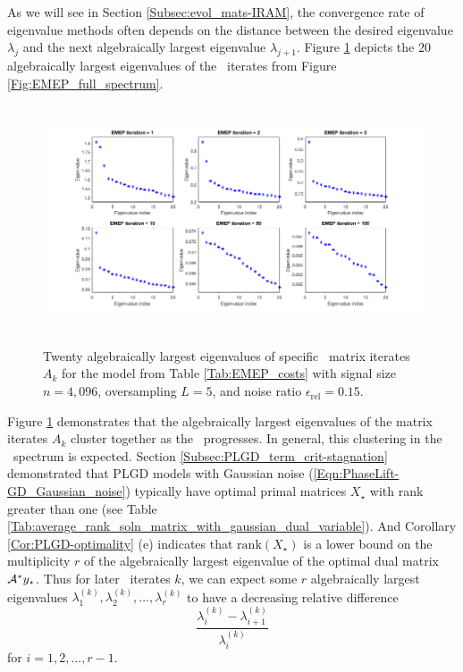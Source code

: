 As we will see in Section \ref{Subsec:evol_mats-IRAM}, the convergence rate of eigenvalue methods often depends on the distance between the desired eigenvalue $\lambda_j$ and the next algebraically largest eigenvalue $\lambda_{j+1}$.  Figure \ref{Fig:EMEP_largest_eigvals} depicts the 20 algebraically largest eigenvalues of the \emep \ iterates from Figure \ref{Fig:EMEP_full_spectrum}.


\begin{figure}[H]
\centering
\hbox{\hspace{-1.2cm} \includegraphics[scale=0.6]{EMEP_largest_eigvals} }\vspace{-0.4cm}
	\caption{Twenty algebraically largest eigenvalues of specific \emep \ matrix iterates $A_k$ for the model from Table \ref{Tab:EMEP_costs} with signal size $n = 4,096$, oversampling $L = 5$, and noise ratio $\epsilon_\text{rel} = 0.15$.}
\label{Fig:EMEP_largest_eigvals}
\end{figure}

Figure \ref{Fig:EMEP_largest_eigvals} demonstrates that the algebraically largest eigenvalues of the matrix iterates $A_k$ cluster together as the \emep \ progresses.  
In general, this clustering in the \emep \ spectrum is expected.  
Section \ref{Subsec:PLGD_term_crit-stagnation} demonstrated that PLGD models with Gaussian noise (\ref{Eqn:PhaseLift-GD_Gaussian_noise}) typically have optimal primal matrices $X_\star$ with rank greater than one (see Table \ref{Tab:average_rank_soln_matrix_with_gaussian_dual_variable}).
And Corollary \ref{Cor:PLGD-optimality} (e) indicates that $\text{rank}(X_\star)$ is a lower bound on the multiplicity $r$ of the algebraically largest eigenvalue of the optimal dual matrix ${\mathcal A}^*y_\star$.
Thus for later \emep \ iterates $k$, we can expect some $r$ algebraically largest eigenvalues $\lambda_1^{(k)}, \lambda_2^{(k)}, \ldots, \lambda_r^{(k)}$ to have a decreasing relative difference
\[
\frac{\lambda_i^{(k)} - \lambda_{i+1}^{(k)}}
	{\lambda_i^{(k)}}
\]
for $i = 1, 2, \ldots, r-1$.



